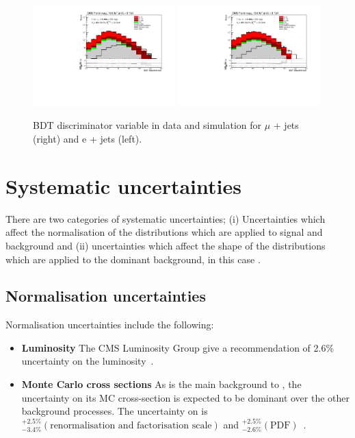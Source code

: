 \begin{figure}[!ht]
    \includegraphics[width=0.49\textwidth]{images/Run1/MVA_Mu.pdf}
    \includegraphics[width=0.49\textwidth]{images/Run1/MVA_e.pdf}
    \caption{BDT discriminator variable in data and simulation for $\mu$ + jets (right) and e + jets (left).}
    \label{fig:BDT}
\end{figure}

\section{Systematic uncertainties}
\label{sec:uncertainties}
There are two categories of systematic uncertainties; (i) Uncertainties which affect the normalisation of the distributions which are applied to signal and background and (ii) uncertainties which affect the shape of the distributions which are applied to the dominant background, in this case \ttbar. 
\subsection{Normalisation uncertainties}
Normalisation uncertainties include the following:
\begin{itemize}
\item \textbf{Luminosity}
The CMS Luminosity Group give a recommendation of 2.6$\%$ uncertainty on the luminosity~\cite{CMS-PAS-LUM-12-001}.
\item \textbf{Monte Carlo cross sections}
As \ttbar is the main background to \tttt, the uncertainty on its MC cross-section is expected to be dominant over the other background processes. The uncertainty on \ttbar is ${}^{+2.5\%}_{-3.4\%} \left( \textrm{renormalisation and factorisation scale} \right)$ and ${}^{+2.5\%}_{-2.6\%} \left( \textrm{PDF} \right)$~\cite{PhysRevLett.110.252004}.
\end{itemize}

